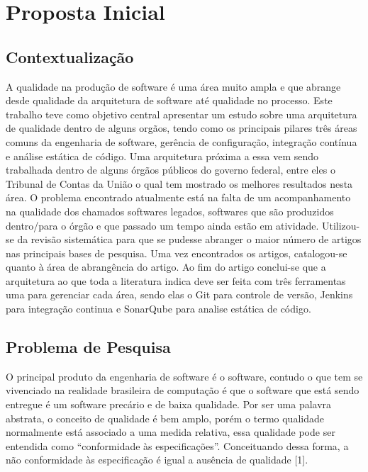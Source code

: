 
\chapter[Proposta Inicial]{Proposta Inicial}

\section{Contextualização}
	A qualidade na produção de software é uma área muito ampla e que abrange desde qualidade da arquitetura de software até qualidade no processo. Este trabalho teve como objetivo central apresentar um estudo sobre uma arquitetura de qualidade dentro de alguns orgãos, tendo como os principais pilares três áreas comuns da engenharia de software, gerência de configuração, integração contínua e análise estática de código. Uma arquitetura próxima a essa vem sendo trabalhada dentro de alguns órgãos públicos do governo federal, entre eles o Tribunal de Contas da União o qual tem mostrado os melhores resultados nesta área. O problema encontrado atualmente está na falta de um acompanhamento na qualidade dos chamados softwares legados, softwares que são produzidos dentro/para o órgão e que passado um tempo ainda estão em atividade.
	Utilizou-se da revisão sistemática para que se pudesse abranger o maior número de artigos nas principais bases de pesquisa. Uma vez encontrados os artigos, catalogou-se quanto à área de abrangência do artigo. Ao fim do artigo conclui-se que a arquitetura ao que toda a literatura indica deve ser feita com três ferramentas uma para gerenciar cada área, sendo elas o Git para controle de versão, Jenkins para integração continua e SonarQube para analise estática de código.

	

	
\section{Problema de Pesquisa}
	O principal produto da engenharia de software é o software, contudo o que tem se vivenciado na realidade brasileira de computação é que o software que está sendo entregue é um software precário e de baixa qualidade. Por ser uma palavra abstrata, o conceito de qualidade é bem amplo, porém o termo qualidade normalmente está associado a uma medida relativa, essa qualidade pode ser entendida como “conformidade às especificações”. Conceituando dessa forma, a não conformidade às especificação é igual a ausência de qualidade [1].
	
